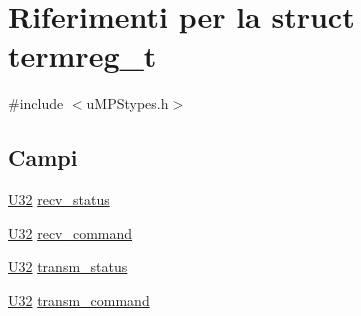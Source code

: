 \hypertarget{structtermreg__t}{\section{Riferimenti per la struct termreg\-\_\-t}
\label{structtermreg__t}
}


{\ttfamily \#include $<$u\-M\-P\-Stypes.\-h$>$}

\subsection*{Campi}
\begin{DoxyCompactItemize}
\item 
\hyperlink{base_8h_ac3df7cf3c8cb172a588adec881447d68}{U32} \hyperlink{structtermreg__t_adb515c26e4c6508ab1a44cc43a8a91ae}{recv\-\_\-status}
\item 
\hyperlink{base_8h_ac3df7cf3c8cb172a588adec881447d68}{U32} \hyperlink{structtermreg__t_aaee0ee8a649c4a4792f3ee83350db6ea}{recv\-\_\-command}
\item 
\hyperlink{base_8h_ac3df7cf3c8cb172a588adec881447d68}{U32} \hyperlink{structtermreg__t_ab3957b0f10a0e492e4e29b90167f513d}{transm\-\_\-status}
\item 
\hyperlink{base_8h_ac3df7cf3c8cb172a588adec881447d68}{U32} \hyperlink{structtermreg__t_a2b198d43d6df5503425e365297cd5444}{transm\-\_\-command}
\end{DoxyCompactItemize}


